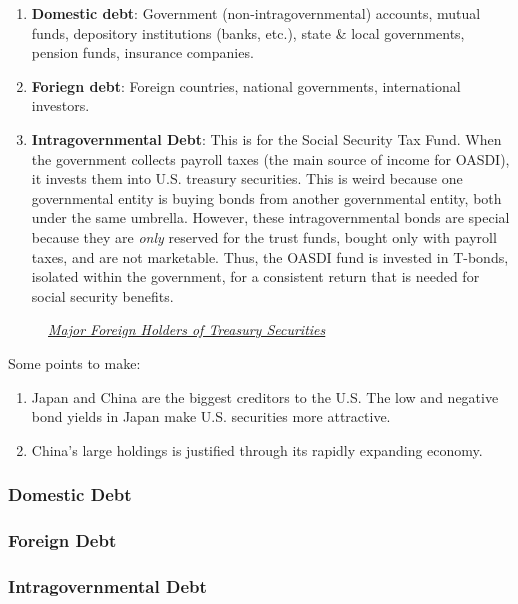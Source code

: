 \documentclass{article}
\begin{document}
    \begin{enumerate}
      \item \textbf{Domestic debt}: Government (non-intragovernmental) accounts, mutual funds, depository institutions (banks, etc.), state \& local governments, pension funds, insurance companies.
      \item \textbf{Foriegn debt}: Foreign countries, national governments, international investors.
      \item \textbf{Intragovernmental Debt}: This is for the Social Security Tax Fund. When the government collects payroll taxes (the main source of income for OASDI), it invests them into U.S. treasury securities. This is weird because one governmental entity is buying bonds from another governmental entity, both under the same umbrella. However, these intragovernmental bonds are special because they are \textit{only} reserved for the trust funds, bought only with payroll taxes, and are not marketable. Thus, the OASDI fund is invested in T-bonds, isolated within the government, for a consistent return that is needed for social security benefits.
    \end{enumerate}

    \begin{figure}[H]
      \centering 
      \caption{\href{https://ticdata.treasury.gov/Publish/mfh.txt}{\textit{Major Foreign Holders of Treasury Securities}}} 
      \label{fig:foreign_debt_holders}
    \end{figure}

    Some points to make:
    \begin{enumerate}
      \item Japan and China are the biggest creditors to the U.S. The low and negative bond yields in Japan make U.S. securities more attractive.
      \item China's large holdings is justified through its rapidly expanding economy.
    \end{enumerate}

    \subsubsection{Domestic Debt}

    \subsubsection{Foreign Debt}

    \subsubsection{Intragovernmental Debt}
\end{document}
